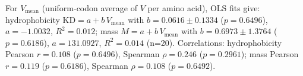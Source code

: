 For $V_\mathrm{mean}$ (uniform-codon average of $V$ per amino acid), OLS fits give: hydrophobicity $\mathrm{KD}=a+b\,V_\mathrm{mean}$ with $b=0.0616\pm 0.1334$ ($p=0.6496$), $a=-1.0032$, $R^2=0.012$; mass $M=a+b\,V_\mathrm{mean}$ with $b=0.6973\pm 1.3764$ ($p=0.6186$), $a=131.0927$, $R^2=0.014$ (n=20). Correlations: hydrophobicity Pearson $r=0.108$ ($p=0.6496$), Spearman $\rho=0.246$ ($p=0.2961$); mass Pearson $r=0.119$ ($p=0.6186$), Spearman $\rho=0.108$ ($p=0.6492$).
